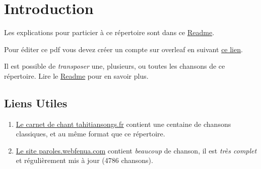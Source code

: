 
\newpage
\maketitle
\section*{Introduction}

\noindent Les explications pour particier à ce répertoire sont dans ce \href{https://github.com/tahitoaa/songbookreadme/blob/master/songbookreadme.md}{Readme}.

\noindent Pour éditer ce pdf vous devez créer un compte sur overleaf en suivant \href{https://fr.overleaf.com/9457921969mhjkwjdnycqj}{ce lien}.

\noindent Il est possible de \emph{transposer} une, plusieurs, ou toutes les chansons de ce répertoire. Lire le \href{https://github.com/tahitoaa/songbookreadme/blob/master/songbookreadme.md}{Readme} pour en savoir plus.


\subsection*{Liens Utiles}

\begin{enumerate}
    \item \href{http://tahitiansongs.fr/wp-content/uploads/2011/11/carnet_de_chants2.pdf}{Le carnet de chant tahitiansongs.fr} contient une centaine de chansons classiques, et au même format que ce répertoire.
    \item \href{http://paroles.webfenua.com/list.php}{Le site paroles.webfenua.com} contient \emph{beaucoup} de chanson, il est \emph{très complet} et régulièrement mis à jour (4786 chansons).
\end{enumerate}

\newpage

\newpage
